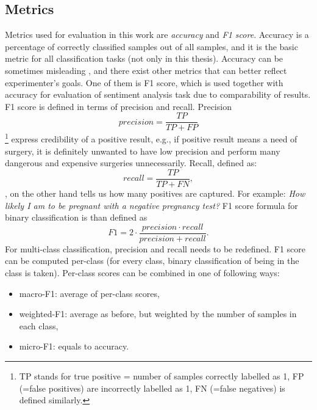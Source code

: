 \subsection{Metrics}
Metrics used for evaluation in this work are \textit{accuracy} and \textit{F1 score}. 
Accuracy is a percentage of correctly classified samples out of all samples, and it is the basic metric for all classification tasks (not only in this thesis). Accuracy can be sometimes misleading \citep{davisoriginal}, and there exist other metrics that can better reflect experimenter's goals. One of them is F1 score, which is used together with accuracy for evaluation of sentiment analysis task due to comparability of results. F1 score is defined in terms of precision and recall. Precision  
$$\mathit{precision} = \frac{TP}{TP + FP}$$\footnote{TP stands for true positive = number of samples correctly labelled as 1, FP (=false positives) are incorrectly labelled as 1, FN (=false negatives) is defined similarly.} express credibility of a positive result, e.g., if positive result means  a need of surgery, it is definitely unwanted to have low precision and perform many dangerous and expensive surgeries unnecessarily. Recall, defined as: $$\mathit{recall} = \frac{TP}{TP + FN},$$,
on the other hand tells us how many positives are captured. For example: \textit{How likely I am to be pregnant with a negative pregnancy test?} F1 score formula for binary classification is than defined as
$$F1 = 2 \cdot \frac{precision \cdot recall}{precision + recall}.$$
For multi-class classification, precision and recall needs to be redefined. F1 score can be computed per-class (for every class, binary classification of being in the class is taken). Per-class scores can be combined in one of following ways:
\begin{itemize}
\item macro-F1: average of per-class scores,
\item weighted-F1: average as before, but weighted by the number of samples in each class,
\item micro-F1: equals to accuracy.
\end{itemize}
\par
\newpage

\newpage

